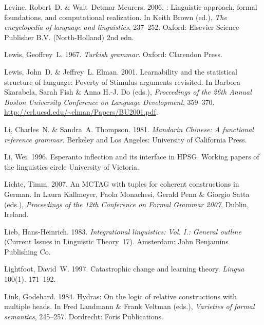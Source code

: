 \begin{thebibliography}{1420}
Levine, Robert~D. \& Walt~Detmar Meurers. 2006.
: {Linguistic} approach, formal
  foundations, and computational realization.
\newblock In Keith Brown (ed.), \emph{The encyclopedia of language and
  linguistics}, 237--252. Oxford: Elsevier Science Publisher B.V.
  (North-Holland) 2nd edn.

Lewis, Geoffrey~L. 1967.
\newblock \emph{Turkish grammar}.
\newblock Oxford: Clarendon Press.

Lewis, John~D. \& Jeffrey~L. Elman. 2001.
\newblock Learnability and the statistical structure of language: {Poverty of
  Stimulus} arguments revisited.
\newblock In Barbora Skarabela, Sarah Fish \& Anna H.-J. Do (eds.),
  \emph{Proceedings of the {26th Annual Boston University Conference on
  Language Development}}, 359--370.
\newblock \urlprefix\url{http://crl.ucsd.edu/~elman/Papers/BU2001.pdf}.

Li, Charles~N. \& Sandra~A. Thompson. 1981.
\newblock \emph{{Mandarin Chinese}: {A} functional reference grammar}.
\newblock Berkeley and Los Angeles: University of California Press.

Li, Wei. 1996.
\newblock Esperanto inflection and its interface in {HPSG}.
\newblock Working papers of the linguistics circle University of Victoria.

Lichte, Timm. 2007.
\newblock An {MCTAG} with tuples for coherent constructions in {German}.
\newblock In Laura Kallmeyer, Paola Monachesi, Gerald Penn \& Giorgio Satta
  (eds.), \emph{Proceedings of the {12th Conference on Formal Grammar 2007}},
  Dublin, Ireland.

Lieb, Hans-Heinrich. 1983.
\newblock \emph{Integrational linguistics: {Vol. I.}: {General} outline}
  (Current Issues in Linguistic Theory~17).
\newblock Amsterdam: John Benjamins Publishing Co.

Lightfoot, David~W. 1997.
\newblock Catastrophic change and learning theory.
\newblock \emph{Lingua} 100(1). 171--192.

Link, Godehard. 1984.
\newblock Hydras: {On} the logic of relative constructions with multiple heads.
\newblock In Fred Landmann \& Frank Veltman (eds.), \emph{Varieties of formal
  semantics}, 245--257. Dordrecht: Foris Publications.


\end{thebibliography}
